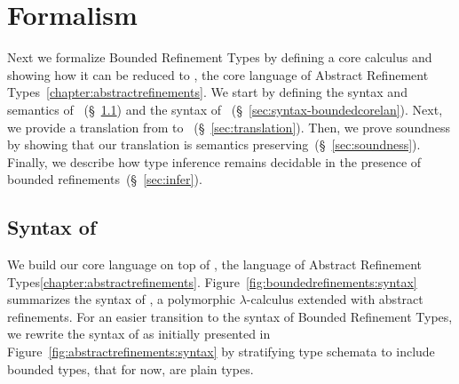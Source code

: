 \section{Formalism}\label{sec:check}

Next we formalize Bounded Refinement Types by defining
a core calculus \boundedcorelan and showing how it can
be reduced to \corelan, the core language of Abstract
Refinement Types~\ref{chapter:abstractrefinements}.
%
We start by defining the syntax
and semantics of \corelan~(\S~\ref{sec:syntax-corelan})
and the syntax of \boundedcorelan~(\S~\ref{sec:syntax-boundedcorelan}).
%
Next, we provide a translation from \boundedcorelan to
\corelan ~(\S~\ref{sec:translation}).
%
Then, we prove soundness by showing that our translation
is semantics preserving~(\S~\ref{sec:soundness}).
%
Finally, we describe how type inference remains
decidable in the presence of bounded refinements~(\S~\ref{sec:infer}).


\subsection{Syntax of \corelan}\label{sec:syntax-corelan}



We build our core language on top of \corelan, the language
of Abstract Refinement Types\ref{chapter:abstractrefinements}.
%
Figure~\ref{fig:boundedrefinements:syntax} summarizes the syntax of \corelan,
a polymorphic $\lambda$-calculus extended with abstract
refinements.
%
For an easier transition to the syntax of Bounded Refinement Types, 
we rewrite the syntax of \corelan as initially presented in Figure~\ref{fig:abstractrefinements:syntax}
by stratifying type schemata to include bounded types, that for now, 
are plain types.


